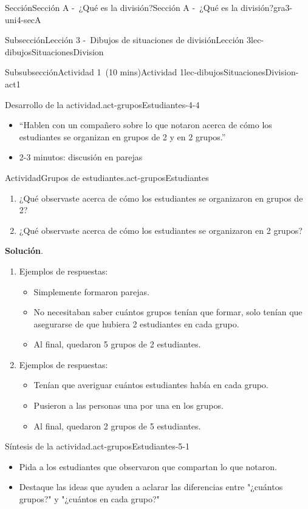 \documentclass[oneside,10pt,]{article}
\newcommand{\blocktitlefont}{\relax}
\begin{document}
\begin{sectionptx}{Sección}{Sección A -~¿Qué es la división?}{}{Sección A -~¿Qué es la división?}{}{}{gra3-uni4-secA}
\begin{subsectionptx}{Subsección}{Lección 3 -~Dibujos de situaciones de división}{}{Lección 3}{}{}{lec-dibujosSituacionesDivision}
\begin{subsubsectionptx}{Subsubsección}{Actividad 1~(10 mins)}{}{Actividad 1}{}{}{lec-dibujosSituacionesDivision-act1}
\begin{paragraphs}{Desarrollo de la actividad.}{act-gruposEstudiantes-4-4}
\begin{itemize}[label=\textbullet]
\item{}``Hablen con un compañero sobre lo que notaron acerca de cómo los estudiantes se organizan en grupos de 2 y en 2 grupos.''%
\item{}2-3 minutos: discusión en parejas%
\end{itemize}
\end{paragraphs}%
\begin{activity}{Actividad}{Grupos de estudiantes.}{act-gruposEstudiantes}%
%
\begin{enumerate}
\item{}¿Qué observaste acerca de cómo los estudiantes se organizaron en grupos de 2?%
\item{}¿Qué observaste acerca de cómo los estudiantes se organizaron en 2 grupos?%
\end{enumerate}
%
\par\smallskip%
\noindent\textbf{\blocktitlefont Solución}.\hypertarget{act-gruposEstudiantes-3}{}\quad{}%
\begin{enumerate}
\item{}Ejemplos de respuestas:%
%
\begin{itemize}[label=\textbullet]
\item{}Simplemente formaron parejas.%
\item{}No necesitaban saber cuántos grupos tenían que formar, solo tenían que asegurarse de que hubiera 2 estudiantes en cada grupo.%
\item{}Al final, quedaron 5 grupos de 2 estudiantes.%
\end{itemize}
\item{}Ejemplos de respuestas:%
%
\begin{itemize}[label=\textbullet]
\item{}Tenían que averiguar cuántos estudiantes había en cada grupo.%
\item{}Pusieron a las personas una por una en los grupos.%
\item{}Al final, quedaron 2 grupos de 5 estudiantes.%
\end{itemize}
\end{enumerate}
\end{activity}%
\par
\begin{paragraphs}{Síntesis de la actividad.}{act-gruposEstudiantes-5-1}%
%
\begin{itemize}[label=\textbullet]
\item{}Pida a los estudiantes que observaron que compartan lo que notaron.%
\item{}Destaque las ideas que ayuden a aclarar las diferencias entre "¿cuántos grupos?" y "¿cuántos en cada grupo?"%

\end{itemize}
\end{paragraphs}
\end{subsubsectionptx}
\end{subsectionptx}
\end{sectionptx}
\end{document}
